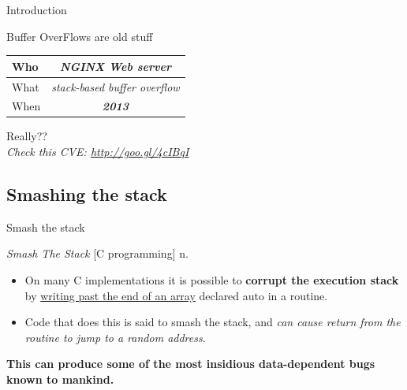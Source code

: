 \begin{frame}{Introduction}
\begin{block}{Buffer OverFlows are old stuff}
\begin{center}
\begin{tabular}{l|c}
\hline
Who  & \emph{NGINX Web server} \\
\hline 
What & \emph{stack-based buffer overflow} \\
\hline
When & \emph{ \Large \bf \color{red} 2013 } \\
\hline
\end{tabular}
\end{center}
\hfill Really??\\
\hfill \emph{Check this CVE: \url{http://goo.gl/4cIBqI}}
\end{block}

\end{frame}

\subsection{Smashing the stack}

\begin{frame}{Smash the stack}
\begin{block}{\emph{Smash The Stack} [C programming] n.}
\begin{itemize}
\item On many C implementations it is possible to {\bf corrupt the execution stack} by \underline{writing past the end of an array} declared auto in a routine.
\item Code that does this is said to smash the stack, and \emph{can cause return from the routine to jump to a random address}.
\end{itemize}
\begin{center}
\bf This can produce some of the most insidious data-dependent bugs known to mankind.
\end{center}
\end{block}
\end{frame}
